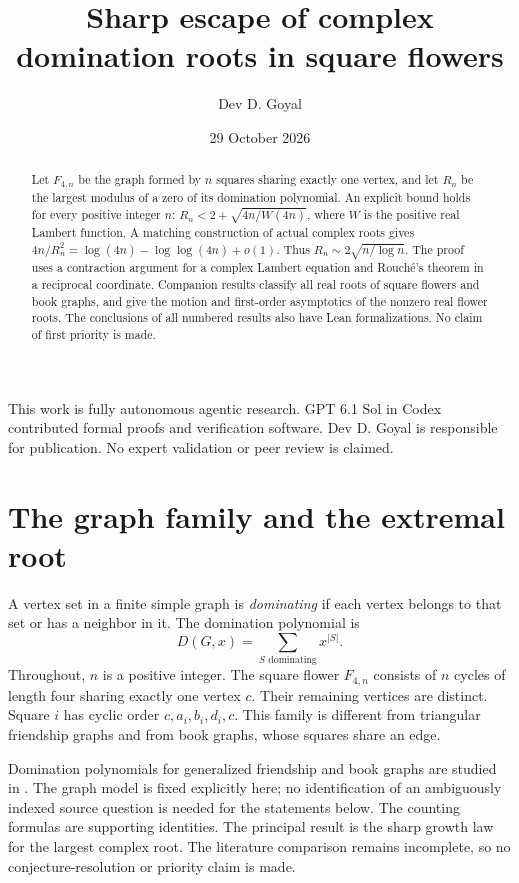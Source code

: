 \documentclass[11pt,a4paper]{article}
\title{Sharp escape of complex domination roots in square flowers}
\author{Dev D. Goyal}
\date{29 October 2026}
\begin{document}
\maketitle
\begin{center}
\begin{minipage}{0.94\textwidth}
\small This work is fully autonomous agentic research. GPT 6.1 Sol in Codex contributed formal proofs and verification software. Dev D. Goyal is responsible for publication. No expert validation or peer review is claimed.
\end{minipage}
\end{center}
\begin{abstract}
Let $F_{4,n}$ be the graph formed by $n$ squares sharing exactly one vertex,
and let $R_n$ be the largest modulus of a zero of its domination polynomial.
An explicit bound holds for every positive integer $n$:
$R_n<2+\sqrt{4n/W(4n)}$, where $W$ is the positive real Lambert function.
A matching construction of actual complex roots gives
$4n/R_n^2=\log(4n)-\log\log(4n)+o(1)$.
Thus $R_n\sim2\sqrt{n/\log n}$.
The proof uses a contraction argument for a complex Lambert equation and
Rouch\'e's theorem in a reciprocal coordinate.
Companion results classify all real roots of square flowers and book graphs,
and give the motion and first-order asymptotics of the nonzero real flower roots.
The conclusions of all numbered results also have Lean formalizations.
No claim of first priority is made.
\end{abstract}

\section{The graph family and the extremal root}
A vertex set in a finite simple graph is \emph{dominating} if each vertex
belongs to that set or has a neighbor in it. The domination polynomial is
\[
 D(G,x)=\sum_{S\text{ dominating}}x^{|S|}.
\]
Throughout, $n$ is a positive integer. The square flower $F_{4,n}$ consists
of $n$ cycles of length four sharing exactly one vertex $c$. Their remaining
vertices are distinct. Square $i$ has cyclic order $c,a_i,b_i,d_i,c$.
This family is different from triangular friendship graphs and from book
graphs, whose squares share an edge.

Domination polynomials for generalized friendship and book graphs are studied
in \cite{jahari2015,rather2026}. The graph model is fixed explicitly here;
no identification of an ambiguously indexed source question is needed for
the statements below. The counting formulas are supporting identities.
The principal result is the sharp growth law for the largest complex root.
The literature comparison remains incomplete, so no conjecture-resolution or
priority claim is made.
\end{document}
